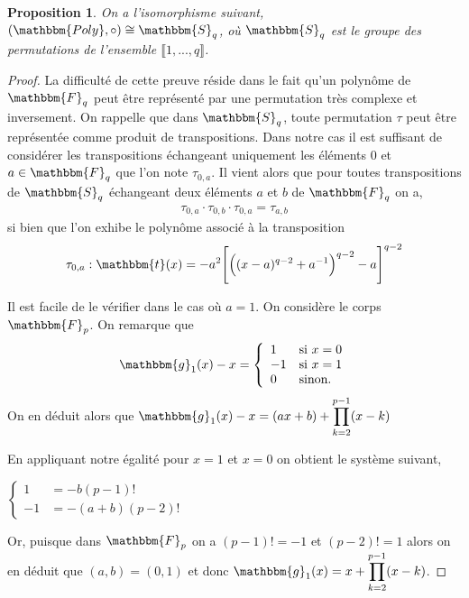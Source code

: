 \documentclass[12pt]{article}
\newtheorem{prop}{Proposition}
\theoremstyle{definition}
\begin{document}
\begin{prop}
 On a l'isomorphisme suivant, $(\mathbbm{Poly}, \circ) \cong \mathbbm{S}_q$, où $\mathbbm{S}_q$ est le groupe des permutations de l'ensemble $\llbracket 1, ... , q \rrbracket$.
\end{prop}

\begin{proof}
La difficulté de cette preuve réside dans le fait qu'un polynôme de $\mathbbm{F}_q$ peut être représenté par une permutation très complexe et inversement. On rappelle que dans $\mathbbm{S}_q$, toute permutation $\tau$ peut être représentée comme produit de transpositions. Dans notre cas il est suffisant de considérer les transpositions échangeant uniquement les éléments $0$ et $a \in \mathbbm{F}_q$ que l'on note $\tau_{0,a}$. Il vient alors que pour toutes transpositions de $\mathbbm{S}_q$ échangeant deux éléments $a$ et $b$ de $\mathbbm{F}_q$ on a,
\begin{align*}
\tau_{0,a} \cdot \tau_{0,b} \cdot \tau_{0,a} = \tau_{a,b}
\end{align*}
si bien que l'on exhibe le polynôme associé à la transposition
\begin{align*}
\tau_{0,a} : \mathbbm{t} (x) = -a^2 \Bigg [ \Big ((x-a)^{q-2} + a^{-1} \Big )^{q-2} - a \Bigg ]^{q-2}
\end{align*}

Il est facile de le vérifier dans le cas où $a = 1$. On considère le corps $\mathbbm{F}_p$. On remarque que 
	$$
\mathbbm{g}_1 (x) - x = \left\{
    \begin{array}{ll}
        1 & \mbox{si } x = 0 \\
       -1 & \mbox{si } x = 1 \\
       0 & \mbox{sinon.}
    \end{array}
\right.
$$
On en déduit alors que $\displaystyle \mathbbm{g}_1  (x)- x = (ax + b) +  \prod_{k=2}^{p-1} (x-k)$

En appliquant notre égalité pour $x=1$ et $x=0$ on obtient le système suivant,
\begin{center}
$
\left\{
    \begin{array}{ll}
    	1 &= -b(p-1)!\\
    	-1 &= -(a+b)(p-2)!
    \end{array}
\right.
$
\end{center}
Or, puisque dans $\mathbbm{F}_p$ on a $(p-1)! = -1$ et $(p-2)! = 1$ alors on en déduit que $(a,b) = (0,1)$ et donc $\displaystyle \mathbbm{g}_1 (x) = x +  \prod_{k=2}^{p-1} (x-k)$.
\end{proof}
\end{document}
